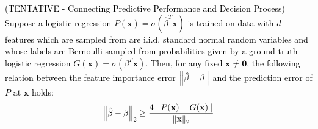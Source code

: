 \documentclass[mnsc,blindrev]{informs3}
\newcommand{\bx}{\mathbf{x}}
\begin{document}
    \textcolor{black}{
        \begin{theorem}{(TENTATIVE - Connecting Predictive Performance and Decision Process)}
            Suppose a logistic regression $P(\bx) = \sigma(\hat{\beta}^T \bx)$ is trained on data with $d$ features which are sampled from are i.i.d. standard normal random variables and whose labels are Bernoulli sampled from probabilities given by a ground truth logistic regression $G(\bx)=\sigma(\beta^T \bx)$. 
            Then, for any fixed $\bx\neq \mathbf{0}$, %
            the following relation between the feature importance error $\norm{\hat{\beta}-\beta}$ and the prediction error of $P$ at $\bx$ holds:
            \begin{equation*}
                \norm{\hat{\beta} - \beta}_2 \geq \frac{4\mid P(\bx) - G(\bx)\mid}{\norm{\bx}_2}
            \end{equation*}
        \end{theorem}
}
\end{document}
